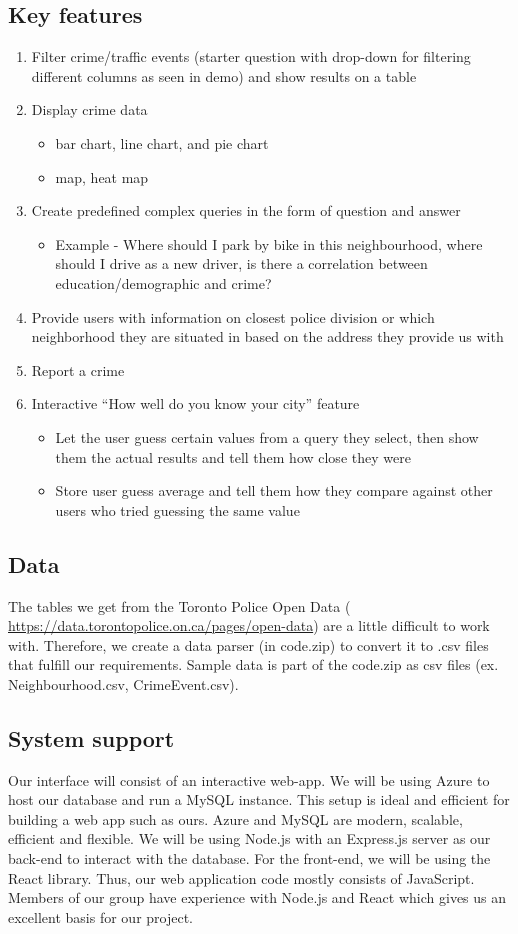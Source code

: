 \documentclass[12pt, a4paper]{article}
\begin{document}
\subsection*{Key features}
\begin{enumerate}
\item Filter crime/traffic events (starter question with drop-down for filtering different columns as seen in demo) and show results on a table
\item Display crime data
\begin{itemize}
\item bar chart, line chart, and pie chart
\item map, heat map
\end{itemize}
\item Create predefined complex queries in the form of question and answer
\begin{itemize}
    \item Example - Where should I park by bike in this neighbourhood, where should I drive as a new driver, is there a correlation between education/demographic and crime?
\end{itemize}
\item Provide users with information on closest police division or which neighborhood they are situated in based on the address they provide us with
\item Report a crime
\item Interactive “How well do you know your city” feature
\begin{itemize}
    \item Let the user guess certain values from a query they select, then show them the actual results and tell them how close they were
    \item Store user guess average and tell them how they compare against other users who tried guessing the same value
\end{itemize}
\end{enumerate}
\subsection*{Data}
The tables we get from the Toronto Police Open Data ( \url{https://data.torontopolice.on.ca/pages/open-data}) are a little difficult to work with. Therefore, we create a data parser (in code.zip) to convert it to .csv files that fulfill our requirements. Sample data is part of the code.zip as csv files (ex. Neighbourhood.csv, CrimeEvent.csv).
\subsection*{System support}
Our interface will consist of an interactive web-app. We will be using Azure to host our database and run a MySQL instance. This setup is ideal and efficient for building a web app such as ours. Azure and MySQL are modern, scalable, efficient and flexible. We will be using Node.js with an Express.js server as our back-end to interact with the database. For the front-end, we will be using the React library. Thus, our web application code mostly consists of JavaScript. Members of our group have experience with Node.js and React which gives us an excellent basis for our project.
\end{document}
